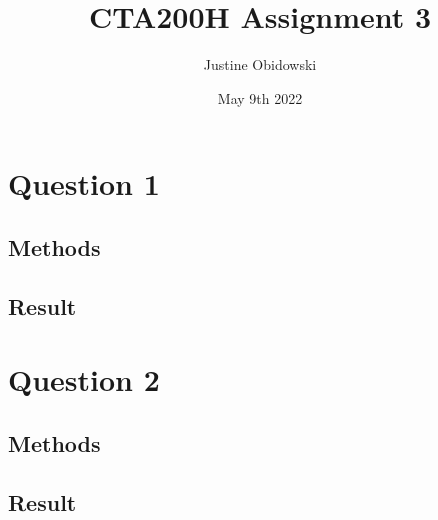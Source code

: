 \documentclass{article}
\title{CTA200H Assignment 3}
\author{Justine Obidowski}
\date{May 9th 2022}
\begin{document}
\maketitle

\section{Question 1}
\subsection{Methods}
\subsection{Result}

\section{Question 2}
\subsection{Methods}
\subsection{Result}
\end{document}

